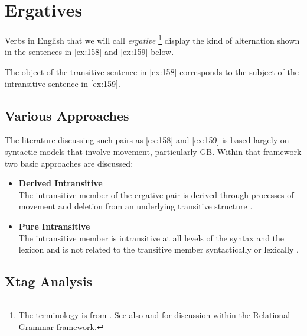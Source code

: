 \chapter{Ergatives} 
\label{ergatives} 
 
Verbs in English that we will call {\it ergative} \footnote {The terminology is from \cite{Burzio86}. See also \cite{Perlmutter78} and \cite{Rosen81} for discussion within the Relational Grammar framework.} display the kind of 
alternation shown in the sentences in \ref{ex:158} and \ref{ex:159} below. 
 
\beginsentences
{}\label{ex:158} 
\label{ex:159} 
\endsentences

 
The object of the transitive sentence in \ref{ex:158} corresponds to the subject 
of the intransitive sentence in \ref{ex:159}. 
 
\section{Various Approaches} 
 
The literature discussing such pairs as \ref{ex:158} and \ref{ex:159} is based largely 
on syntactic models that involve movement, particularly GB.  Within that 
framework two basic approaches are discussed: 
 
\begin{itemize} 
\item {\bf Derived Intransitive}\\ The intransitive member of the 
ergative pair is derived through processes of movement and deletion from an 
underlying transitive structure \cite{Burzio86,HaleKeyser86,HaleKeyser87}. 
 
\item {\bf Pure Intransitive}\\ The intransitive member is intransitive at all levels of the 
syntax and the lexicon and is not related to the transitive member 
syntactically or lexically \cite{Napoli88}. 
\end{itemize} 
 
\section{Xtag Analysis} 
 
